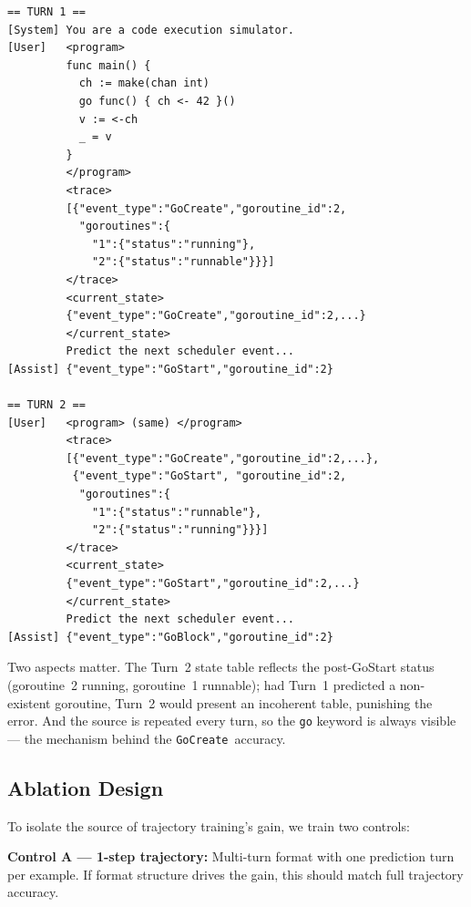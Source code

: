 \documentclass[10pt,conference]{IEEEtran}
\newcommand{\ecreate}{\texttt{GoCreate}}
\begin{document}
\begin{lstlisting}[float, caption={A 2-turn trajectory example (abridged to
fit). The model's Turn 1 prediction (GoStart g2) is appended before
Turn 2 as the next trace event. Turn 2 requests the following event,
conditioning on the updated goroutine state. Loss is applied only to
the assistant turns.},
label={lst:traj}]
== TURN 1 ==
[System] You are a code execution simulator.
[User]   <program>
         func main() {
           ch := make(chan int)
           go func() { ch <- 42 }()
           v := <-ch
           _ = v
         }
         </program>
         <trace>
         [{"event_type":"GoCreate","goroutine_id":2,
           "goroutines":{
             "1":{"status":"running"},
             "2":{"status":"runnable"}}}]
         </trace>
         <current_state>
         {"event_type":"GoCreate","goroutine_id":2,...}
         </current_state>
         Predict the next scheduler event...
[Assist] {"event_type":"GoStart","goroutine_id":2}

== TURN 2 ==
[User]   <program> (same) </program>
         <trace>
         [{"event_type":"GoCreate","goroutine_id":2,...},
          {"event_type":"GoStart", "goroutine_id":2,
           "goroutines":{
             "1":{"status":"runnable"},
             "2":{"status":"running"}}}]
         </trace>
         <current_state>
         {"event_type":"GoStart","goroutine_id":2,...}
         </current_state>
         Predict the next scheduler event...
[Assist] {"event_type":"GoBlock","goroutine_id":2}
\end{lstlisting}

Two aspects matter.
The Turn~2 state table reflects the post-GoStart status (goroutine~2
running, goroutine~1 runnable); had Turn~1 predicted a non-existent
goroutine, Turn~2 would present an incoherent table, punishing the
error.
And the source is repeated every turn, so the \texttt{go} keyword is
always visible — the mechanism behind the \ecreate\ accuracy.

\subsection{Ablation Design}\label{sec:ablation}

To isolate the source of trajectory training's gain, we train two controls:

\textbf{Control A — 1-step trajectory:} Multi-turn format with one
prediction turn per example. If format structure drives the gain,
this should match full trajectory accuracy.
\end{document}
